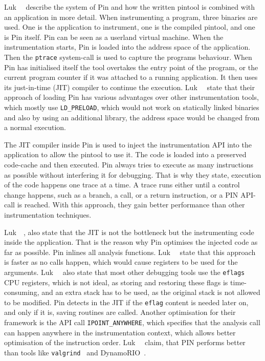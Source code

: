 Luk~\etal~\cite{pintool} describe the system of Pin and how the written pintool
is combined with an application in more detail. When instrumenting a program,
three binaries are used. One is the application to instrument, one is the
compiled pintool, and one is Pin itself. Pin can be seen as a userland virtual
machine. When the instrumentation starts, Pin is loaded into the address space
of the application. Then the \texttt{ptrace} system-call is used to capture the
program\textquotesingle s behaviour. When Pin has initialised itself the tool
overtakes the entry point of the program, or the current program counter if it
was attached to a running application. It then uses its just-in-time (JIT)
compiler to continue the execution. Luk~\etal~\cite{pintool} state that their
approach of loading Pin has various advantages over other instrumentation tools,
which mostly use \texttt{LD\_PRELOAD}, which would not work on statically linked
binaries and also by using an additional library, the address space would be
changed from a normal execution.

The JIT compiler inside Pin is used to inject the instrumentation API into the
application to allow the pintool to use it. The code is loaded into a preserved
code-cache and then executed. Pin always tries to execute as many instructions
as possible without interfering it for debugging. That is why they state,
execution of the code happens one trace at a time. A trace runs either until a
control change happens, such as a branch, a call, or a return instruction, or a
PIN API-call is reached. With this approach, they gain better performance than
other instrumentation techniques.

Luk~\etal~\cite{pintool}, also state that the JIT is not the bottleneck but the
instrumenting code inside the application. That is the reason why Pin optimises
the injected code as far as possible. Pin inlines all analysis functions.
Luk~\etal~\cite{pintool} state that this approach is faster as no calls happen,
which would cause registers to be used for the arguments.
Luk~\etal~\cite{pintool} also state that most other debugging tools use the
\texttt{eflags} CPU registers, which is not ideal, as storing and restoring
these flags is time-consuming, and an extra stack has to be used, as the
original stack is not allowed to be modified. Pin detects in the JIT if the
\texttt{eflag} content is needed later on, and only if it is, saving routines
are called. Another optimisation for their framework is the API call
\texttt{IPOINT\_ANYWHERE}, which specifies that the analysis call can happen
anywhere in the instrumentation context, which allows better optimisation of the
instruction order. Luk~\etal~\cite{pintool} claim, that PIN performs better than
tools like \texttt{valgrind}~\cite{valgrind} and DynamoRIO~\cite{dynrio}.

